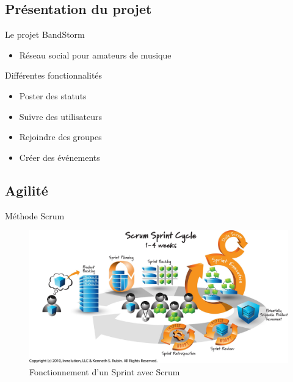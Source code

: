 \DylanSpeak
\subsection{Présentation du projet}
\begin{frame}{Le projet BandStorm}
	\begin{itemize}
		\item Réseau social pour amateurs de musique
	\end{itemize}
	\vfill
	\begin{block}{Différentes fonctionnalités}
		\begin{itemize}
			\item Poster des statuts
			\item Suivre des utilisateurs
			\item Rejoindre des groupes
			\item Créer des événements
		\end{itemize}
	\end{block}
\end{frame}

\JulianSpeak
\subsection{Agilité}
\begin{frame}{Méthode Scrum}
\begin{figure}
\centering
\includegraphics[width=\linewidth]{images/projectManagement/scrum}
\caption{Fonctionnement d'un Sprint avec Scrum}
\label{fig:scrum}
\end{figure}
\end{frame}

